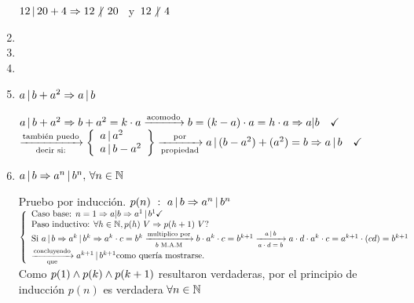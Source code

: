 \documentclass[12pt,a4paper, spanish]{article}
\begin{document}
\begin{enumerate}[label=\roman*)]
	      $12 \divide 20 + 4 \entonces 12 \noDivide 20$  \ y\   $ 12\noDivide 4 $

	\item
	      \separadorCorto
	      \hacer
	\item
	      \separadorCorto
	      \hacer
	\item
	      \separadorCorto
	      \hacer
	\item $a \, | \, b + a^2 \Rightarrow a \, | \, b$
	      \separadorCorto

	      $  a \divide b + a^2 \entonces b + a^2 = k \cdot a \flecha{acomodo} b = (k - a) \cdot a = h \cdot a \entonces a | b \Tilde$\\
	      $ \flecha{también puedo}[decir si:]
		      \llaves{l}{
			      a \divide a^2 \\
			      a \divide b - a^2
		      } \flecha{por}[propiedad] a \divide (b - a^2) + (a^2) = b \entonces a \divide b \Tilde $


	\item $a \, | \, b \Rightarrow a^n \, | \, b^n,\, \forall n \in \mathbb N$
	      \separadorCorto

	      Pruebo por inducción. $p(n)\  :\  a \, | \, b \Rightarrow a^n \, | \, b^n $\\
	      $
		      \llave{l}{
			      \text{Caso base: } n = 1 \entonces a|b \entonces a^1 \divide b^1 \checkmark\\
			      \text{Paso inductivo: } \paratodo h \en \naturales, p(h) \ V \entonces p(h+1)\ V?\\
			      \text{Si } a \divide b \entonces a^k \divide b^k  \entonces a^k \cdot c = b^k
			      \flecha{multiplico por}[$b$ M.A.M]
			      b \cdot a^k \cdot c = b^{k+1}
			      \flecha{$a\divide b$}[$a \cdot d = b$]
			      a\cdot d \cdot a^k \cdot c =  a^{k+1}\cdot(cd) = b^{k+1}\\
			      \flecha{concluyendo}[que] a^{k+1} \divide b^{k+1} \text{como quería mostrarse.}
		      }
	      $ Como $p(1) \land p(k) \land p(k+1)$ resultaron verdaderas, por el principio de inducción $p(n)$
	      es verdadera $\forall n \in \mathbb N$

\end{enumerate}
\end{document}
